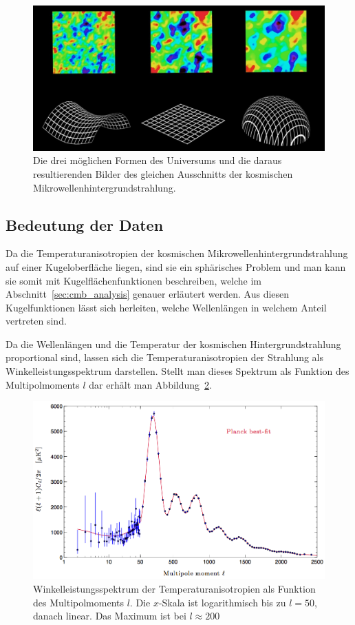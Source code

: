 \begin{figure}
	\centering
	\includegraphics[width=\linewidth]{cmb/images/universe_shapes.jpg}
	\caption{Die drei möglichen Formen des Universums und die daraus 
		resultierenden Bilder des gleichen Ausschnitts der kosmischen
		Mikrowellenhintergrundstrahlung.}
	\label{fig:universe_shapes}
\end{figure}

\subsection{Bedeutung der Daten\label{subsec:cmb:data-meaning}}
Da die Temperaturanisotropien der kosmischen Mikrowellenhintergrundstrahlung 
auf einer Kugel\-oberfläche liegen, sind sie ein sphärisches Problem und man kann 
sie somit mit Kugelflächenfunktionen beschreiben, welche im 
Abschnitt~\ref{sec:cmb_analysis} genauer erläutert werden. Aus diesen 
Kugelfunktionen lässt sich herleiten, welche Wellenlängen in welchem Anteil 
vertreten sind.

Da die Wellenlängen und die Temperatur der kosmischen Hintergrundstrahlung proportional sind, lassen sich die Temperaturanisotropien der Strahlung als Winkelleistungsspektrum darstellen.
Stellt man dieses Spektrum als Funktion des Multipolmoments $l$ dar erhält man 
Abbildung~\ref{fig:planck_spectrum}.

\begin{figure}
	\centering
	\includegraphics[width=\linewidth]{cmb/images/mission_spectrum.png}
	\caption{Winkelleistungsspektrum der Temperaturanisotropien als Funktion 
	des Multipolmoments $l$.
	Die $x$-Skala ist logarithmisch bis zu $l = 50$, danach linear. Das Maximum 
	ist bei $l \approx 200$}
	\label{fig:planck_spectrum}
\end{figure}

